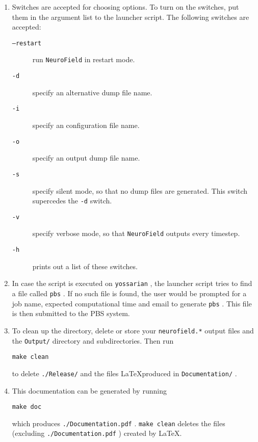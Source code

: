 \documentclass[12pt,a4paper]{article}
\newcommand{\type}[1]{ {\small\small\tt #1} }
\newcommand{\NF}[0]{ \type{NeuroField}}
\begin{document}
\begin{enumerate}
\item Switches are accepted for choosing options. To turn on the switches, put them in the argument list to the launcher script. The following switches are accepted:
	\begin{description}
	\item[\type{--restart}] run \NF in restart mode.
	\item[\type{-d}] specify an alternative dump file name.
	\item[\type{-i}] specify an configuration file name.
	\item[\type{-o}] specify an output dump file name.
	\item[\type{-s}] specify silent mode, so that no dump files are generated. This switch supercedes the \type{-d} switch.
	\item[\type{-v}] specify verbose mode, so that \NF outputs every timestep.
	\item[\type{-h}] prints out a list of these switches.
	\end{description}

\item In case the script is executed on \type{yossarian}, the launcher script tries to find a file called \type{pbs}. If no such file is found, the user would be prompted for a job name, expected computational time and email to generate \type{pbs}. This file is then submitted to the PBS system.

\item To clean up the directory, delete or store your \type{neurofield.*} output files and the \type{Output/} directory and subdirectories. Then run
\begin{lstlisting}
make clean
\end{lstlisting}
to delete \type{./Release/} and the files \LaTeX produced in \type{Documentation/}.

\item This documentation can be generated by running 
\begin{lstlisting}
make doc
\end{lstlisting}
which produces \type{./Document\-ation.pdf}. \type{make clean} deletes the files (excluding \type{./Document\-ation.pdf}) created by \LaTeX.

\end{enumerate}

\end{document}
